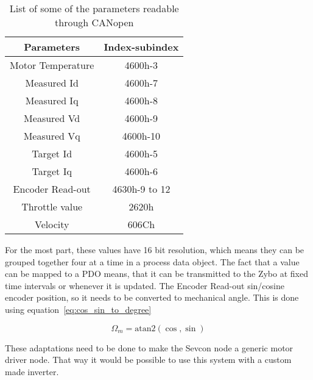 \begin{table}[h]
	\centering
	\begin{tabular}{| c | c |}
		\hline
		Parameters & Index-subindex \\ %
		\hline
		Motor Temperature & 4600h-3 \\ %
		Measured Id & 4600h-7  \\ %
		Measured Iq & 4600h-8  \\ %
		Measured Vd & 4600h-9  \\ %
		Measured Vq & 4600h-10 \\ %
		Target Id & 4600h-5    \\ %
		Target Iq & 4600h-6    \\ %
		Encoder Read-out & 4630h-9 to 12 \\ %
		Throttle value & 2620h \\ %
		Velocity & 606Ch       \\ %
		\hline	
	\end{tabular}
	\caption{List of some of the parameters readable through CANopen}
	\label{tab:parameters_of_interest}
\end{table}

For the most part, these values have 16 bit resolution, which means they can be grouped together four at a time in a process data object.
The fact that a value can be mapped to a PDO means, that it can be transmitted to the Zybo at fixed time intervals or whenever it is updated.
The Encoder Read-out sin/cosine encoder position, so it needs to be converted to mechanical angle. 
This is done using equation~\ref{eq:cos_sin_to_degree}

\begin{equation}
\Omega_m = \mathrm{atan2}(\cos,\sin)
\label{eq:cos_sin_to_degree}
\end{equation}

These adaptations need to be done to make the Sevcon node a generic motor driver node.
That way it would be possible to use this system with a custom made inverter.
